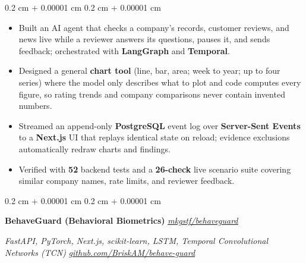\documentclass[10pt, letterpaper]{article}
\newenvironment{highlights}{
    \small
    \begin{itemize}[
        topsep=0.02 cm,
        parsep=0.015 cm,
        partopsep=0pt,
        itemsep=0.015 cm,
        leftmargin=0.4 cm + 10pt
    ]
}{
    \end{itemize}
} %
\newenvironment{onecolentry}{
    \begin{adjustwidth}{
        0.2 cm + 0.00001 cm
    }{
        0.2 cm + 0.00001 cm
    }
}{
    \end{adjustwidth}
} %
\let\hrefWithoutArrow\href
\renewcommand{\href}[2]{\hrefWithoutArrow{#1}{\uline{#2}}}
\newcommand{\printlink}[2]{\href{#1}{#2}}
\begin{document}
        \vspace{0.03 cm}
        \begin{onecolentry}
            \begin{highlights}
                \item Built an AI agent that checks a company's records, customer reviews, and news live while a reviewer answers its questions, pauses it, and sends feedback; orchestrated with \textbf{LangGraph} and \textbf{Temporal}.
                \item Designed a general \textbf{chart tool} (line, bar, area; week to year; up to four series) where the model only describes what to plot and code computes every figure, so rating trends and company comparisons never contain invented numbers.
                \item Streamed an append-only \textbf{PostgreSQL} event log over \textbf{Server-Sent Events} to a \textbf{Next.js} UI that replays identical state on reload; evidence exclusions automatically redraw charts and findings.
                \item Verified with \textbf{52} backend tests and a \textbf{26-check} live scenario suite covering similar company names, rate limits, and reviewer feedback.
            \end{highlights}
        \end{onecolentry}

        \vspace{0.04 cm}

        \begin{onecolentry}
            \textbf{BehaveGuard (Behavioral Biometrics)} \hfill \textit{\footnotesize \printlink{https://github.com/mkgstf/behaveguard}{mkgstf/behaveguard}}

            \textit{FastAPI, PyTorch, Next.js, scikit-learn, LSTM, Temporal Convolutional Networks (TCN)} \hfill \textit{\footnotesize \printlink{https://github.com/BriskAM/behave-guard}{github.com/BriskAM/behave-guard}}
        \end{onecolentry}
\end{document}
